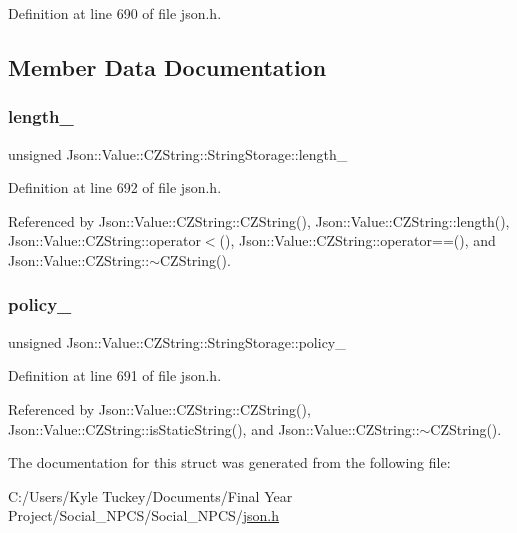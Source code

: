 Definition at line 690 of file json.\+h.



\subsection{Member Data Documentation}
\mbox{\label{struct_json_1_1_value_1_1_c_z_string_1_1_string_storage_a165d865c44e6471d34668eeb4f15b140}} 
\subsubsection{\texorpdfstring{length\+\_\+}{length\_}}
{\footnotesize\ttfamily unsigned Json\+::\+Value\+::\+C\+Z\+String\+::\+String\+Storage\+::length\+\_\+}



Definition at line 692 of file json.\+h.



Referenced by Json\+::\+Value\+::\+C\+Z\+String\+::\+C\+Z\+String(), Json\+::\+Value\+::\+C\+Z\+String\+::length(), Json\+::\+Value\+::\+C\+Z\+String\+::operator$<$(), Json\+::\+Value\+::\+C\+Z\+String\+::operator==(), and Json\+::\+Value\+::\+C\+Z\+String\+::$\sim$\+C\+Z\+String().

\mbox{\label{struct_json_1_1_value_1_1_c_z_string_1_1_string_storage_a7f68c8d6197c5692a525854b5f29f87b}} 
\subsubsection{\texorpdfstring{policy\+\_\+}{policy\_}}
{\footnotesize\ttfamily unsigned Json\+::\+Value\+::\+C\+Z\+String\+::\+String\+Storage\+::policy\+\_\+}



Definition at line 691 of file json.\+h.



Referenced by Json\+::\+Value\+::\+C\+Z\+String\+::\+C\+Z\+String(), Json\+::\+Value\+::\+C\+Z\+String\+::is\+Static\+String(), and Json\+::\+Value\+::\+C\+Z\+String\+::$\sim$\+C\+Z\+String().



The documentation for this struct was generated from the following file\+:\begin{DoxyCompactItemize}
\item 
C\+:/\+Users/\+Kyle Tuckey/\+Documents/\+Final Year Project/\+Social\+\_\+\+N\+P\+C\+S/\+Social\+\_\+\+N\+P\+C\+S/\hyperlink{json_8h}{json.\+h}\end{DoxyCompactItemize}
